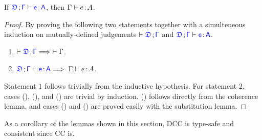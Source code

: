 \begin{lemma} If $\targetcon \vdash \itemtype{e}{A}$, then $\Gamma \vdash e \hspace{0.5mm}{:}\hspace{0.5mm} A$.
\begin{proof}
By proving the following two statements together with a simulteneous induction on mutually-defined judgements $\vdash \targetcon$ and $\targetcon \vdash \itemtype{e}{A}$.
\begin{enumerate}
	\item $\vdash \targetcon \Longrightarrow\ \vdash \Gamma$.
	\item $\targetcon \vdash \itemtype{e}{A} \Longrightarrow\ {\Gamma} \vdash {e} \goodcolon {A}$.
\end{enumerate}
Statement $1$ follows trivially from the inductive hypothesis. For statement $2$, cases (), (), and () are trivial by induction. () follows directly from the coherence lemma, and cases () and () are proved easily with the substitution lemma.
\end{proof}

\end{lemma}

As a corollary of the lemmas shown in this section, DCC is type-safe and consistent since CC is.




